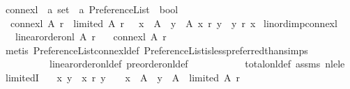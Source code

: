 \begin{isabellebody}
\isanewline
{}\isamarkupfalse%
\ connex{\isacharunderscore}{\kern0pt}l\ {\isacharcolon}{\kern0pt}{\isacharcolon}{\kern0pt}\ {\isachardoublequoteopen}{\isacharprime}{\kern0pt}a\ set\ {\isasymRightarrow}\ {\isacharprime}{\kern0pt}a\ Preference{\isacharunderscore}{\kern0pt}List\ {\isasymRightarrow}\ bool{\isachardoublequoteclose}\ \isanewline
\ \ {\isachardoublequoteopen}connex{\isacharunderscore}{\kern0pt}l\ A\ r\ {\isasymequiv}\ limited\ A\ r\ {\isasymand}\ {\isacharparenleft}{\kern0pt}{\isasymforall}\ x\ {\isasymin}\ A{\isachardot}{\kern0pt}\ {\isasymforall}\ y\ {\isasymin}\ A{\isachardot}{\kern0pt}\ x\ {\isasymlesssim}\isactrlsub r\ y\ {\isasymor}\ y\ {\isasymlesssim}\isactrlsub r\ x{\isacharparenright}{\kern0pt}{\isachardoublequoteclose}\isanewline
\isanewline
{}\isamarkupfalse%
\ lin{\isacharunderscore}{\kern0pt}ord{\isacharunderscore}{\kern0pt}imp{\isacharunderscore}{\kern0pt}connex{\isacharunderscore}{\kern0pt}l{\isacharcolon}{\kern0pt}\isanewline
\ \ \ {\isachardoublequoteopen}linear{\isacharunderscore}{\kern0pt}order{\isacharunderscore}{\kern0pt}on{\isacharunderscore}{\kern0pt}l\ A\ r{\isachardoublequoteclose}\isanewline
\ \ \ {\isachardoublequoteopen}connex{\isacharunderscore}{\kern0pt}l\ A\ r{\isachardoublequoteclose}\isanewline
%
\isadelimproof
\ \ %
\endisadelimproof
%
\isatagproof
{}\isamarkupfalse%
\ {\isacharparenleft}{\kern0pt}metis\ Preference{\isacharunderscore}{\kern0pt}List{\isachardot}{\kern0pt}connex{\isacharunderscore}{\kern0pt}l{\isacharunderscore}{\kern0pt}def\ Preference{\isacharunderscore}{\kern0pt}List{\isachardot}{\kern0pt}is{\isacharunderscore}{\kern0pt}less{\isacharunderscore}{\kern0pt}preferred{\isacharunderscore}{\kern0pt}than{\isachardot}{\kern0pt}simps\ \isanewline
\ \ \ \ \ \ \ \ \ \ linear{\isacharunderscore}{\kern0pt}order{\isacharunderscore}{\kern0pt}on{\isacharunderscore}{\kern0pt}l{\isacharunderscore}{\kern0pt}def\ preorder{\isacharunderscore}{\kern0pt}on{\isacharunderscore}{\kern0pt}l{\isacharunderscore}{\kern0pt}def\ \isanewline
\ \ \ \ \ \ \ \ \ \ total{\isacharunderscore}{\kern0pt}on{\isacharunderscore}{\kern0pt}l{\isacharunderscore}{\kern0pt}def\ assms\ nle{\isacharunderscore}{\kern0pt}le{\isacharparenright}{\kern0pt}%
\endisatagproof
{\isafoldproof}%
%
\isadelimproof
\isanewline
%
\endisadelimproof
\isanewline
\isanewline
{}\isamarkupfalse%
\ limitedI{\isacharcolon}{\kern0pt}\isanewline
\ \ {\isachardoublequoteopen}{\isacharparenleft}{\kern0pt}{\isasymAnd}\ x\ y{\isachardot}{\kern0pt}\ {\isasymlbrakk}\ x\ {\isasymlesssim}\isactrlsub r\ y\ {\isasymrbrakk}\ {\isasymLongrightarrow}\ \ x\ {\isasymin}\ A\ {\isasymand}\ y\ {\isasymin}\ A{\isacharparenright}{\kern0pt}\ {\isasymLongrightarrow}\ limited\ A\ r{\isachardoublequoteclose}\isanewline

\end{isabellebody}
